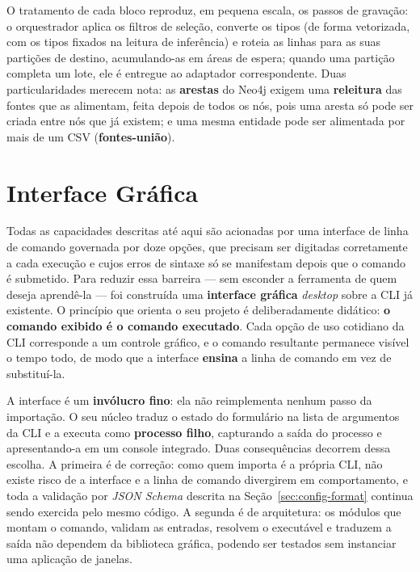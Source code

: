 O tratamento de cada bloco reproduz, em pequena escala, os passos de gravação: o
orquestrador aplica os filtros de seleção, converte os tipos (de forma vetorizada, com os
tipos fixados na leitura de inferência) e roteia as linhas para as suas partições de
destino, acumulando-as em áreas de espera; quando uma partição completa um lote, ele é
entregue ao adaptador correspondente. Duas particularidades merecem nota: as
\textbf{arestas} do Neo4j exigem uma \textbf{releitura} das fontes que as alimentam, feita
depois de todos os nós, pois uma aresta só pode ser criada entre nós que já existem; e uma
mesma entidade pode ser alimentada por mais de um CSV (\textbf{fontes-união}).

\section{Interface Gráfica}
\label{sec:interface-grafica}

Todas as capacidades descritas até aqui são acionadas por uma interface de linha de comando
governada por doze opções, que precisam ser digitadas corretamente a cada execução e cujos
erros de sintaxe só se manifestam depois que o comando é submetido. Para reduzir essa barreira
--- sem esconder a ferramenta de quem deseja aprendê-la --- foi construída uma
\textbf{interface gráfica} \textit{desktop} sobre a CLI já existente. O princípio que orienta
o seu projeto é deliberadamente didático: \textbf{o comando exibido é o comando executado}.
Cada opção de uso cotidiano da CLI corresponde a um controle gráfico, e o comando resultante
permanece visível
o tempo todo, de modo que a interface \textbf{ensina} a linha de comando em vez de substituí-la.

A interface é um \textbf{invólucro fino}: ela não reimplementa nenhum passo da importação.
O seu núcleo traduz o estado do formulário na lista de argumentos da CLI e a executa como
\textbf{processo filho}, capturando a saída do processo e apresentando-a em um console
integrado. Duas consequências decorrem dessa escolha. A primeira é de correção: como quem
importa é a própria CLI, não existe risco de a interface e a linha de comando divergirem em
comportamento, e toda a validação por \textit{JSON Schema} descrita na
Seção~\ref{sec:config-format} continua sendo exercida pelo mesmo código. A segunda é
de arquitetura: os módulos que montam o comando, validam as entradas, resolvem o executável e
traduzem a saída não dependem da biblioteca gráfica, podendo ser testados sem instanciar uma
aplicação de janelas.

